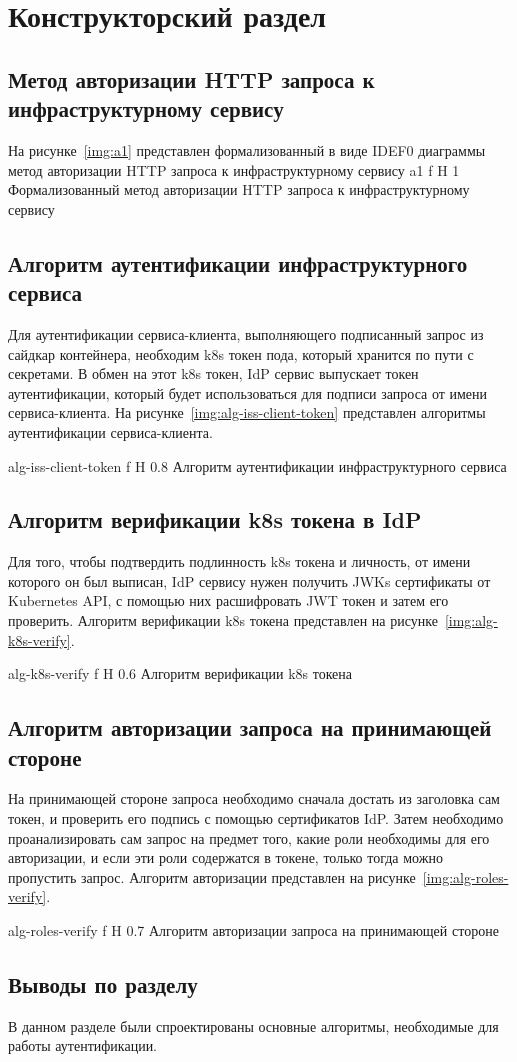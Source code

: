 \chapter{Конструкторский раздел}

\section{Метод авторизации HTTP запроса к инфраструктурному сервису}
На рисунке~\ref{img:a1} представлен формализованный в виде IDEF0 диаграммы метод авторизации HTTP запроса к инфраструктурному сервису
    {a1}
    {f}
    {H}
    {1\textwidth}
    {Формализованный метод авторизации HTTP запроса к инфраструктурному сервису}


\section{Алгоритм аутентификации инфраструктурного сервиса}
Для аутентификации сервиса-клиента, выполняющего подписанный запрос из сайдкар контейнера, необходим k8s токен пода, который хранится по пути с секретами. В обмен на этот k8s токен, IdP сервис выпускает токен аутентификации, который будет использоваться для подписи запроса от имени сервиса-клиента. На рисунке~\ref{img:alg-iss-client-token} представлен алгоритмы аутентификации сервиса-клиента.

    {alg-iss-client-token}
    {f}
    {H}
    {0.8\textwidth}
    {Алгоритм аутентификации инфраструктурного сервиса}


\section{Алгоритм верификации k8s токена в IdP}
Для того, чтобы подтвердить подлинность k8s токена и личность, от имени которого он был выписан, IdP сервису нужен получить JWKs сертификаты от Kubernetes API, с помощью них расшифровать JWT токен и затем его проверить. Алгоритм верификации k8s токена представлен на рисунке~\ref{img:alg-k8s-verify}.

    {alg-k8s-verify}
    {f}
    {H}
    {0.6\textwidth}
    {Алгоритм верификации k8s токена}
    

\section{Алгоритм авторизации запроса на принимающей стороне}
На принимающей стороне запроса необходимо сначала достать из заголовка сам токен, и проверить его подпись с помощью сертификатов IdP. Затем необходимо проанализировать сам запрос на предмет того, какие роли необходимы для его авторизации, и если эти роли содержатся в токене, только тогда можно пропустить запрос. Алгоритм авторизации представлен на рисунке~\ref{img:alg-roles-verify}.

    {alg-roles-verify}
    {f}
    {H}
    {0.7\textwidth}
    {Алгоритм авторизации запроса на принимающей стороне}


\section*{Выводы по разделу}
В данном разделе были спроектированы основные алгоритмы, необходимые для работы аутентификации.